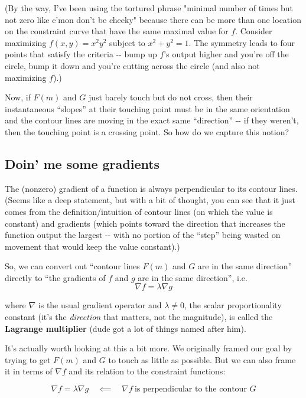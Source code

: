 \documentclass[letterpaper,12pt]{report}
\begin{document}
(By the way, I've been using the tortured phrase "minimal number of
times but not zero like c'mon don't be cheeky" because there can be more
than one location on the constraint curve that have the same maximal
value for \(f\). Consider maximizing \(f(x,y) = x^2 y^2\) subject to
\(x^2 + y^2 = 1\). The symmetry leads to four points that satisfy the
criteria -\/- bump up \(f\)'s output higher and you're off the circle,
bump it down and you're cutting across the circle (and also not
maximizing \(f\)).)

Now, if \(F(m)\) and \(G\) just barely touch but do not cross, then
their instantaneous ``slopes'' at their touching point must be in the same
orientation and the contour lines are moving in the exact same
``direction'' -\/- if they weren't, then the touching point is a crossing
point. So how do we capture this notion?

\subsection{Doin' me some gradients}\label{doin-me-some-gradients}

The (nonzero) gradient of a function is always perpendicular to its
contour lines. (Seems like a deep statement, but with a bit of thought,
you can see that it just comes from the definition/intuition of contour
lines (on which the value is constant) and gradients (which points
toward the direction that increases the function output the largest -\/-
with no portion of the ``step'' being wasted on movement that would keep
the value constant).)

So, we can convert out ``contour lines \(F(m)\) and \(G\) are in the same
direction'' directly to ``the gradients of \(f\) and \(g\) are in the same
direction'', i.e. \[\nabla f = \lambda \nabla g \]

where \(\nabla\) is the usual gradient operator and \(\lambda \neq 0\),
the scalar proportionality constant (it's the \emph{direction} that
matters, not the magnitude), is called the \textbf{Lagrange multiplier}
(dude got a lot of things named after him).

It's actually worth looking at this a bit more. We originally framed our
goal by trying to get \(F(m)\) and \(G\) to touch as little as possible.
But we can also frame it in terms of \(\nabla f\) and its relation to
the constraint functions:

\[\nabla f = \lambda \nabla g \quad \impliedby \quad \nabla f \ \text{is perpendicular to the contour } G \]
\end{document}
